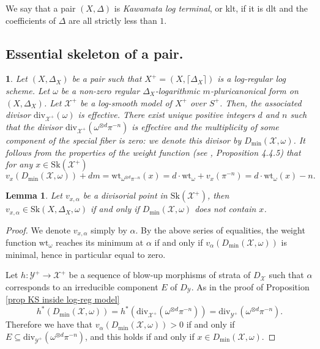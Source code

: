 \documentclass{amsart}%
\numberwithin{equation}{subsection}
\theoremstyle{plain2}
\newtheorem{lemma}[equation]{Lemma}
\theoremstyle{definition2}
\theoremstyle{stepstyle}
\theoremstyle{point}
\theoremstyle{subpoint}
\newtheorem{subpoint}[equation]{}%
\newcommand{\spa}[1]{\begin{subpoint}#1\end{subpoint}}           %
\newcommand{\cX}{\ensuremath{\mathscr{X}}}
\newcommand{\cY}{\ensuremath{\mathscr{Y}}}
\renewcommand{\cY}{\ensuremath{\mathscr{Y}}}
\newcommand{\divisor}{\mathrm{div}}
\newcommand{\weight}{\mathrm{wt}}
\newcommand{\Sk}{\mathrm{Sk}}
\begin{document}
We say that a pair $(X,\Delta)$ is \emph{Kawamata log terminal}, or klt, if it is dlt and the coefficients of $\Delta$ are all strictly less than $1$.

\subsection{Essential skeleton of a pair.}
\spa{Let $(X,\Delta_X)$ be a pair such that $X^+=(X,\lceil \Delta_X \rceil)$ is a log-regular log scheme. Let $\omega$ be a non-zero regular $\Delta_X$-logarithmic $m$-pluricanonical form on $(X,\Delta_X)$. Let $\cX^+$ be a log-smooth model of $X^+$ over $S^+$. Then, the associated divisor $\divisor_{\cX^+}(\omega)$ is effective. There exist unique positive integers $d$ and $n$ such that the divisor $\divisor_{\cX^+}(\omega^{\otimes d} \pi^{-n})$ is effective and the multiplicity of some component of the special fiber is zero: we denote this divisor by $D_{\min}(\cX,\omega)$. It follows from the properties of the weight function (see \cite{MustataNicaise}, Proposition 4.4.5) that for any $x \in \Sk(\cX^+)$ $$v_x(D_{\min}(\cX,\omega)) + dm = \weight_{\omega^{\otimes d}\pi^{-n}}(x)= d \cdot \weight_{\omega} + v_x(\pi^{-n}) = d \cdot \weight_{\omega}(x) -n.$$
}
\begin{lemma} \label{lemma characterization minimal points}
Let $v_{x,\alpha}$ be a divisorial point in $\Sk(\cX^+)$, then $v_{x,\alpha} \in \Sk(X,\Delta_X, \omega)$ if and only if $D_{\min}(\cX,\omega)$ does not contain $x$.
\end{lemma}
\begin{proof}
We denote $v_{x,\alpha}$ simply by $\alpha$. By the above series of equalities, the weight function $\weight_{\omega}$ reaches its minimum at $\alpha$ if and only if $v_\alpha(D_{\min}(\cX,\omega))$ is minimal, hence in particular equal to zero.

Let $h: \cY^+ \rightarrow \cX^+$ be a sequence of blow-up morphisms of strata of $D_\cX$ such that $\alpha$ corresponds to an irreducible component $E$ of $D_\cY$. As in the proof of Proposition \ref{prop KS inside log-reg model} $$h^*(D_{\min}(\cX,\omega))=h^*(\divisor_{\cX^+} (\omega^{\otimes d} \pi^{-n}))= \divisor_{\cY^+} (\omega^{\otimes d} \pi^{-n}).$$ Therefore we have that $v_\alpha(D_{\min}(\cX,\omega)) >0$ if and only if $E \subseteq \divisor_{\cY^+} (\omega^{\otimes d} \pi^{-n})$, and this holds if and only if $x \in D_{\min}(\cX,\omega)$.
\end{proof}
\end{document}
